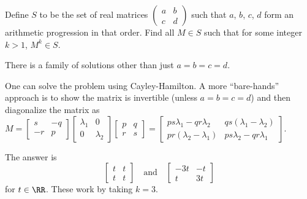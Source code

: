 \begin{problem}
	[Putnam 2015]
	\yod
	Define $S$ to be the set of real matrices
	$\left(\begin{smallmatrix} a & b \\ c & d \end{smallmatrix}\right)$
	such that $a$, $b$, $c$, $d$ form
	an arithmetic progression in that order.
	Find all $M \in S$ such that for some integer $k > 1$, $M^k \in S$.
	\begin{hint}
		There is a family of solutions other than just $a=b=c=d$.

		One can solve the problem using Cayley-Hamilton.
		A more ``bare-hands'' approach is to
		show the matrix is invertible (unless $a=b=c=d$)
		and then diagonalize the matrix as
		$
		M =
		\begin{bmatrix} s & -q \\ -r & p \end{bmatrix}
		\begin{bmatrix} \lambda_1 & 0 \\ 0 & \lambda_2 \end{bmatrix}
		\begin{bmatrix} p & q \\ r & s \end{bmatrix}
		=
		\begin{bmatrix}
			ps\lambda_1 - qr\lambda_2 & qs(\lambda_1-\lambda_2) \\
			pr(\lambda_2-\lambda_1) & ps\lambda_2 - qr\lambda_1
		\end{bmatrix}
		$.
	\end{hint}
	\begin{sol}
		The answer is
		\[ \begin{bmatrix} t&t\\t&t \end{bmatrix}
			\quad\text{and}\quad
			\begin{bmatrix} -3t&-t\\t&3t \end{bmatrix} \]
		for $t \in \RR$.
		These work by taking $k=3$.


\end{sol}
\end{problem}
